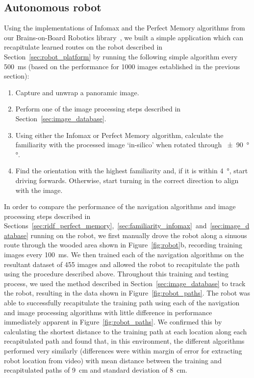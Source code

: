 \documentclass[letterpaper]{article}
\begin{document}
\subsection{Autonomous robot}
Using the implementations of Infomax and the Perfect Memory algorithms from our Brains-on-Board Robotics library~\citep{Dewar2017}, we built a simple application which can recapitulate learned routes on the robot described in Section~\ref{sec:robot_platform} by running the following simple algorithm every \SI{500}{\milli\second} (based on the performance for 1000 images established in the previous section):
%
\begin{enumerate}
    \item Capture and unwrap a panoramic image.
    \item Perform one of the image processing steps described in Section~\ref{sec:image_database}.
    \item Using either the Infomax or Perfect Memory algorithm, calculate the familiarity with the processed image ‘in-silico’ when rotated through \SI{\pm 90}{\degree}°.
    \item Find the orientation with the highest familiarity and, if it is within \SI{4}{\degree}, start driving forwards. Otherwise, start turning in the correct direction to align with the image.
\end{enumerate}
%
In order to compare the performance of the navigation algorithms and image processing steps described in Sections~\ref{sec:ridf_perfect_memory},~\ref{sec:familiarity_infomax}~and~\ref{sec:image_database} running on the robot, we first manually drove the robot along a sinuous route through the wooded area shown in Figure~\ref{fig:robot}b, recording training images every \SI{100}{\milli\second}.
We then trained each of the navigation algorithms on the resultant dataset of \num{455} images and allowed the robot to recapitulate the path using the procedure described above.
Throughout this training and testing process, we used the method described in Section~\ref{sec:image_database} to track the robot, resulting in the data shown in Figure~\ref{fig:robot_paths}.
The robot was able to successfully recapitulate the training path using each of the navigation and image processing algorithms with little difference in performance immediately apparent in Figure~\ref{fig:robot_paths}.
We confirmed this by calculating the shortest distance to the training path at each location along each recapitulated path and found that, in this environment, the different algorithms performed very similarly (differences were within margin of error for extracting robot location from video) with mean distance between the training and recapitulated paths of  \SI{9}{\centi\metre} and standard deviation of \SI{8}{\centi\metre}.
\end{document}
